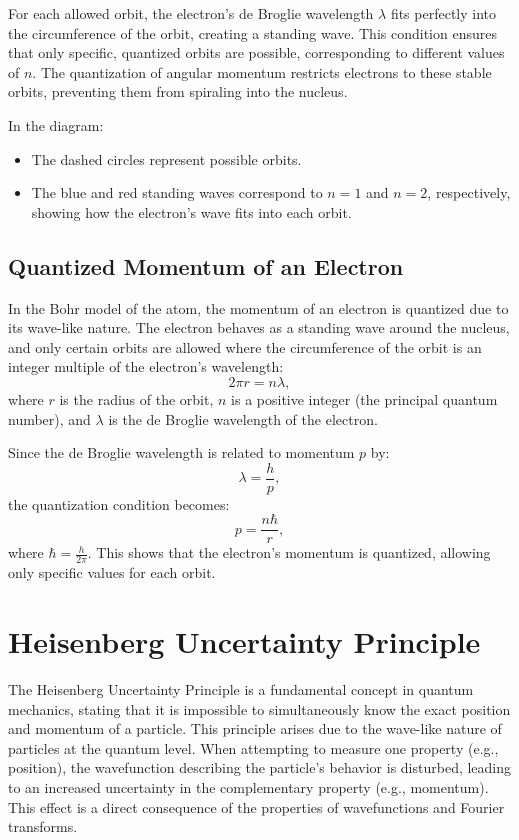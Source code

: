 \documentclass{report}
\begin{document}
For each allowed orbit, the electron’s de Broglie wavelength $\lambda$ fits perfectly into the circumference of the orbit, creating a standing wave. This condition ensures that only specific, quantized orbits are possible, corresponding to different values of $n$. The quantization of angular momentum restricts electrons to these stable orbits, preventing them from spiraling into the nucleus.

In the diagram:
\begin{itemize}
	\item The dashed circles represent possible orbits.
	\item The blue and red standing waves correspond to $n=1$ and $n=2$, respectively, showing how the electron’s wave fits into each orbit.
\end{itemize}

\subsection{Quantized Momentum of an Electron}

In the Bohr model of the atom, the momentum of an electron is quantized due to its wave-like nature. The electron behaves as a standing wave around the nucleus, and only certain orbits are allowed where the circumference of the orbit is an integer multiple of the electron's wavelength:
\[
	2 \pi r = n \lambda,
\]
where $r$ is the radius of the orbit, $n$ is a positive integer (the principal quantum number), and $\lambda$ is the de Broglie wavelength of the electron.

Since the de Broglie wavelength is related to momentum $p$ by:
\[
	\lambda = \frac{h}{p},
\]
the quantization condition becomes:
\[
	p = \frac{n \hbar}{r},
\]
where $\hbar = \frac{h}{2\pi}$. This shows that the electron’s momentum is quantized, allowing only specific values for each orbit.


\section{Heisenberg Uncertainty Principle}

The Heisenberg Uncertainty Principle is a fundamental concept in quantum mechanics, stating that it is impossible to simultaneously know the exact position and momentum of a particle. This principle arises due to the wave-like nature of particles at the quantum level. When attempting to measure one property (e.g., position), the wavefunction describing the particle's behavior is disturbed, leading to an increased uncertainty in the complementary property (e.g., momentum). This effect is a direct consequence of the properties of wavefunctions and Fourier transforms.
\end{document}
